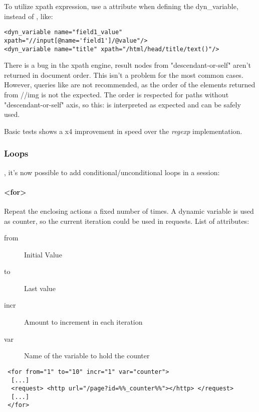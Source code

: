 \documentclass{IDXDOC-en}
\begin{document}
To utilize xpath expression, use a  attribute when
defining the dyn\_variable, instead of , like:
\begin{Verbatim}
<dyn_variable name="field1_value" xpath="//input[@name='field1']/@value"/>
<dyn_variable name="title" xpath="/html/head/title/text()"/>
\end{Verbatim}

There is a bug in the xpath engine, result nodes from "descendant-or-self" aren't returned in document order. This isn't a problem for the most common cases.
However, queries like  are not recommended, as the order of the  elements returned from //img is not the expected.
The order is respected for paths without "descendant-or-self" axis, so this:  is interpreted as expected and can be safely used.

Basic tests shows a x4 improvement in speed over the \emph{regexp} implementation.

\subsubsection{Loops}

, it's now possible to add conditional/unconditional loops in a session:

\paragraph{<for>}


Repeat the enclosing actions a fixed number of times. A dynamic
variable is used as counter, so the current iteration could be used in
requests. List of attributes:

\begin{description}
\item[from] Initial Value
\item[to]   Last value
\item[incr] Amount to increment in each iteration
\item[var]  Name of the variable to hold the counter
\end{description}

\begin{Verbatim}
 <for from="1" to="10" incr="1" var="counter">
  [...]
  <request> <http url="/page?id=%%_counter%%"></http> </request>
  [...]
 </for>
\end{Verbatim}
\end{document}
